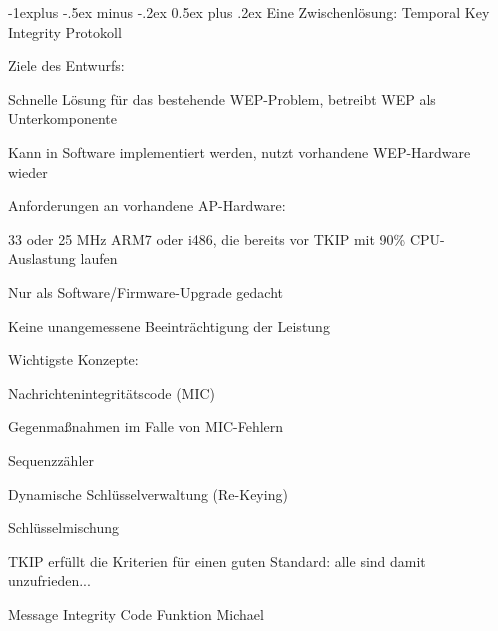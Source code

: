 \documentclass[a4paper]{article}
\makeatletter
\renewcommand{\subsection}{\@startsection{subsection}{2}{0mm}%
 {-1explus -.5ex minus -.2ex}%
 {0.5ex plus .2ex}%
 {\normalfont\normalsize\bfseries}}
\makeatother
\begin{document}
\begin{multicols}{3}
      \subsection{Eine Zwischenlösung: Temporal Key Integrity
            Protokoll}

      \begin{itemize*}
            \item
            Ziele des Entwurfs:

            \begin{itemize*}
                  \item Schnelle Lösung für das bestehende WEP-Problem, betreibt WEP als Unterkomponente
                  \item Kann in Software implementiert werden, nutzt vorhandene WEP-Hardware wieder
                  \item Anforderungen an vorhandene AP-Hardware:
                  \begin{itemize*} \item 33 oder 25 MHz ARM7 oder i486, die bereits vor TKIP mit 90\% CPU-Auslastung laufen \item Nur als Software/Firmware-Upgrade gedacht \item Keine unangemessene Beeinträchtigung der Leistung \end{itemize*}
            \end{itemize*}
            \item
            Wichtigste Konzepte:

            \begin{itemize*}
                  \item Nachrichtenintegritätscode (MIC)
                  \item Gegenmaßnahmen im Falle von MIC-Fehlern
                  \item Sequenzzähler
                  \item Dynamische Schlüsselverwaltung (Re-Keying)
                  \item Schlüsselmischung
            \end{itemize*}
            \item
            TKIP erfüllt die Kriterien für einen guten Standard: alle sind damit
            unzufrieden...
      \end{itemize*}

      Message Integrity Code Funktion Michael


\end{multicols}
\end{document}
